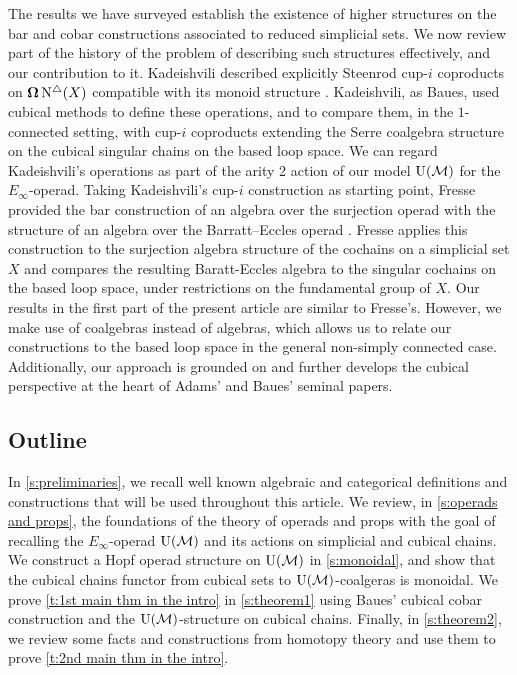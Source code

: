 The results we have surveyed establish the existence of higher structures on the bar and cobar constructions associated to reduced simplicial sets.
We now review part of the history of the problem of describing such structures effectively, and our contribution to it.
Kadeishvili described explicitly Steenrod cup-$i$ coproducts on $\operatorname{\mathbf{\Omega}} \operatorname{N^{\triangle}}(X)$ compatible with its monoid structure \cite{kadeishvili1999coproducts, kadeishvili2003cupi}.
Kadeishvili, as Baues, used cubical methods to define these operations, and to compare them, in the $1$-connected setting, with cup-$i$ coproducts extending the Serre coalgebra structure on the cubical singular chains on the based loop space.
We can regard Kadeishvili's operations as part of the arity 2 action of our model ${\operatorname{U}(\mathcal{M})}$ for the $E_{\infty}$-operad.
Taking Kadeishvili's cup-$i$ construction as starting point, Fresse provided the bar construction of an algebra over the surjection operad with the structure of an algebra over the Barratt–Eccles operad \cite{fresse2003hopf}.
Fresse applies this construction to the surjection algebra structure of the cochains on a simplicial set $X$ and compares the resulting Baratt-Eccles algebra to the singular cochains on the based loop space, under restrictions on the fundamental group of $X$.
Our results in the first part of the present article are similar to Fresse's.
However, we make use of coalgebras instead of algebras, which allows us to relate our constructions to the based loop space in the general non-simply connected case.
Additionally, our approach is grounded on and further develops the cubical perspective at the heart of Adams' and Baues' seminal papers.

\subsection*{Outline}

In \cref{s:preliminaries}, we recall well known algebraic and categorical definitions and constructions that will be used throughout this article.
We review, in \cref{s:operads and props}, the foundations of the theory of operads and props with the goal of recalling the $E_{\infty}$-operad ${\operatorname{U}(\mathcal{M})}$ and its actions on simplicial and cubical chains.
We construct a Hopf operad structure on ${\operatorname{U}(\mathcal{M})}$ in \cref{s:monoidal}, and show that the cubical chains functor from cubical sets to ${\operatorname{U}(\mathcal{M})}$-coalgeras is monoidal.
We prove \cref{t:1st main thm in the intro} in \cref{s:theorem1} using Baues' cubical cobar construction and the ${\operatorname{U}(\mathcal{M})}$-structure on cubical chains.
Finally, in \cref{s:theorem2}, we review some facts and constructions from homotopy theory and use them to prove \cref{t:2nd main thm in the intro}.